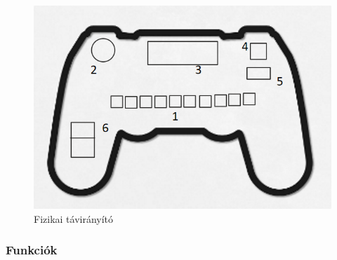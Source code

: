 \documentclass{article}
\begin{document}
\begin{figure}[H]
\centering
\includegraphics[width=1\linewidth]{fizikaitavir_feluletter.png}
\caption{\label{fig:image}Fizikai távirányító}
\end{figure}


\subsubsection{Funkciók}
\end{document}
